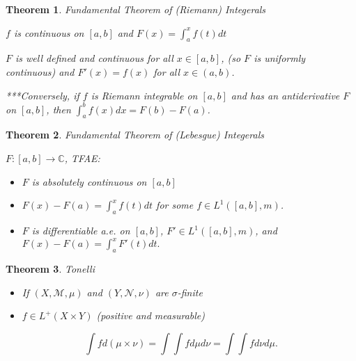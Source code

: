 \documentclass[12pt]{Qual}
\newtheorem{theorem}{Theorem}
\begin{document}
\vspace{0.5cm}
\begin{theorem}{\Large\textit{Fundamental Theorem of (Riemann) Integerals}}

 $f$ is continuous on $[a,b]$ and $\displaystyle F(x)=\int_a^xf(t)dt$
\vspace{-0.25cm}

\hspace{0.1cm}\begin{minipage}{0.85\textwidth}
\vspace{0.5cm}
$F$ is well defined and continuous for all $x\in[a,b]$, (so $F$ is uniformly continuous) and $F'(x)=f(x)$ for all $x\in(a,b)$.
\end{minipage}
\vspace{0.5cm}

\begin{mybox}
***Conversely, if $f$ is Riemann integrable on $[a,b]$ and has an antiderivative $F$ on $[a,b]$, then $\displaystyle\int_a^bf(x)dx=F(b)-F(a)$.
\end{mybox}

\end{theorem}
\vspace{0.25cm}
\begin{theorem}{\Large\textit{Fundamental Theorem of (Lebesgue) Integerals}}

$F:[a,b]\to\mathbb{C}$, TFAE:
\begin{itemize}
\renewcommand\labelitemi{\faPuzzlePiece}
    \item $F$ is absolutely continuous on $[a,b]$
    \item $\displaystyle F(x)-F(a)=\int_a^xf(t)dt$ for some $f\in L^1([a,b],m)$.
    \item $F$ is differentiable a.e. on $[a,b]$, $F'\in L^1([a,b],m)$, and $\displaystyle F(x)-F(a)=\int_a^xF'(t)dt.$
\end{itemize}

\end{theorem}
\vspace{0.25cm}
\begin{theorem}{\Large\textit{Tonelli}}

\vspace{-0.25cm}
\begin{itemize}[leftmargin=2.5cm]
\renewcommand\labelitemi{\faPuzzlePiece}
    \item If $(X,\mathscr{M},\mu)$ and $(Y,\mathscr{N},\nu)$ are $\sigma$-finite
    \item $f\in L^+(X\times Y)$ (positive and measurable)
\end{itemize}

 $$\int fd(\mu\times\nu)=\int\int fd\mu d\nu=\int\int fd\nu d\mu.$$

\end{theorem}
\end{document}
